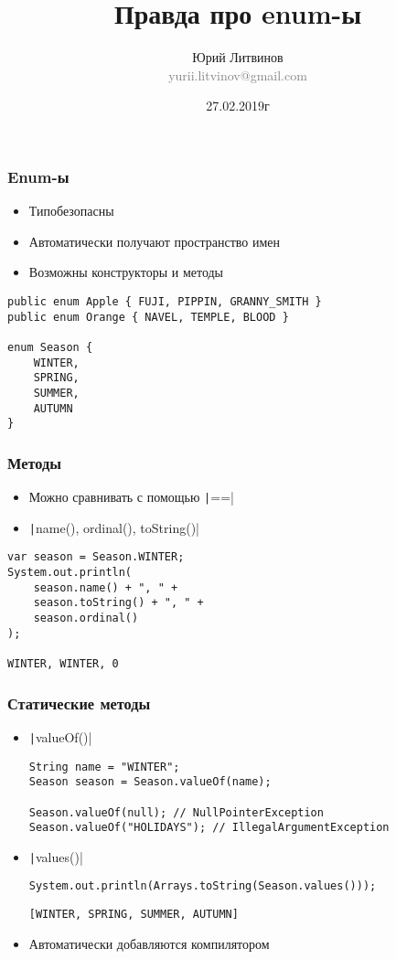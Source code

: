 \documentclass[xetex,mathserif,serif]{beamer}
\title{Правда про enum-ы}
\author[Юрий Литвинов]{Юрий Литвинов\\\small{\textcolor{gray}{yurii.litvinov@gmail.com}}}
\date{27.02.2019г}
\begin{document}
	\frame{\titlepage}

	\begin{frame}[fragile]
		\frametitle{Enum-ы}
		\begin{itemize}
			\item Типобезопасны
			\item Автоматически получают пространство имен
			\item Возможны конструкторы и методы
		\end{itemize}
		\begin{verbatim}
public enum Apple { FUJI, PIPPIN, GRANNY_SMITH }
public enum Orange { NAVEL, TEMPLE, BLOOD }

enum Season {
    WINTER, 
    SPRING,
    SUMMER, 
    AUTUMN
}
		\end{verbatim}
	\end{frame}

	\begin{frame}[fragile]
		\frametitle{Методы}
		\begin{itemize}
			\item Можно сравнивать с помощью \texttt|==|
			\item \texttt|name(), ordinal(), toString()|
		\end{itemize}
		\begin{verbatim}
var season = Season.WINTER; 
System.out.println(
    season.name() + ", " +
    season.toString() + ", " +
    season.ordinal()
);

WINTER, WINTER, 0
		\end{verbatim}
	\end{frame}

	\begin{frame}[fragile]
		\frametitle{Статические методы}
		\begin{itemize}
			\item \texttt|valueOf()|
				\begin{verbatim}
String name = "WINTER"; 
Season season = Season.valueOf(name); 

Season.valueOf(null); // NullPointerException
Season.valueOf("HOLIDAYS"); // IllegalArgumentException
				\end{verbatim}
			\item \texttt|values()|
				\begin{verbatim}
System.out.println(Arrays.toString(Season.values()));
				\end{verbatim}
				\vspace{3mm}
				\begin{verbatim}
[WINTER, SPRING, SUMMER, AUTUMN]
				\end{verbatim}
			\item Автоматически добавляются компилятором
		\end{itemize}
	\end{frame}
\end{document}
